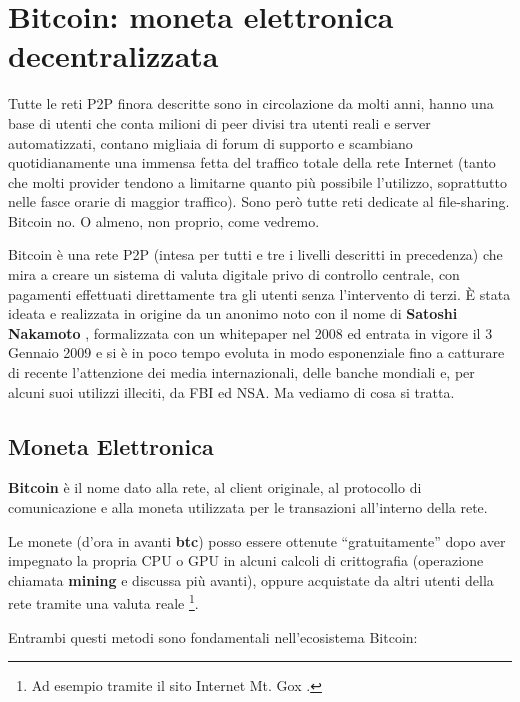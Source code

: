 \chapter{Bitcoin: moneta elettronica decentralizzata}\label{bitcoin-moneta-elettronica-decentralizzata}

Tutte le reti P2P finora descritte sono in circolazione da molti anni, hanno una base di utenti che conta milioni di peer divisi tra utenti reali e server automatizzati, contano migliaia di forum di supporto e scambiano quotidianamente una immensa fetta del traffico totale della rete Internet (tanto che molti provider tendono a limitarne quanto più possibile l'utilizzo, soprattutto nelle fasce orarie di maggior traffico). Sono però tutte reti dedicate al file-sharing. Bitcoin no. O almeno, non proprio, come vedremo.

Bitcoin è una rete P2P (intesa per tutti e tre i livelli descritti in precedenza) che mira a creare un sistema di valuta digitale privo di controllo centrale, con pagamenti effettuati direttamente tra gli utenti senza l'intervento di terzi. È stata ideata e realizzata in origine da un anonimo noto con il nome di \textbf{Satoshi Nakamoto} \cite{bitcoin}, formalizzata con un whitepaper nel 2008 ed entrata in vigore il 3 Gennaio 2009 e si è in poco tempo evoluta in modo esponenziale fino a catturare di recente l'attenzione dei media internazionali, delle banche mondiali e, per alcuni suoi utilizzi illeciti, da FBI ed NSA. Ma vediamo di cosa si tratta.

\section{Moneta Elettronica}\label{moneta-elettronica}

\textbf{Bitcoin} è il nome dato alla rete, al client originale, al protocollo di comunicazione e alla moneta utilizzata per le transazioni all'interno della rete.

Le monete (d'ora in avanti \textbf{btc}) posso essere ottenute ``gratuitamente'' dopo aver impegnato la propria CPU o GPU in alcuni calcoli di crittografia (operazione chiamata \textbf{mining} e discussa più avanti), oppure acquistate da altri utenti della rete tramite una valuta reale \footnote{Ad esempio tramite il sito Internet Mt. Gox   \cite{mtgox}.}.

Entrambi questi metodi sono fondamentali nell'ecosistema Bitcoin:

